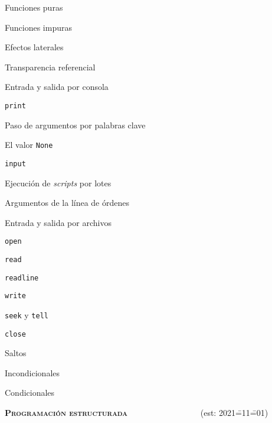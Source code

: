 \begin{longenum}
\begin{longenum}
        \begin{longenum}
            \item Funciones puras
            \item Funciones impuras
            \item Efectos laterales
            \item Transparencia referencial
            \item Entrada y salida por consola
            \begin{longenum}
                \item \texttt{print}
                \begin{longenum}
                    \item Paso de argumentos por palabras clave
                    \item El valor \texttt{None}
                \end{longenum}
                \item \texttt{input}
            \end{longenum}
            \item Ejecución de \textit{scripts} por lotes
            \begin{longenum}
                \item Argumentos de la línea de órdenes
            \end{longenum}
            \item Entrada y salida por archivos
            \begin{longenum}
                \item \texttt{open}
                \item \texttt{read}
                \item \texttt{readline}
                \item \texttt{write}
                \item \texttt{seek} y \texttt{tell}
                \item \texttt{close}
            \end{longenum}
        \end{longenum}
        \item Saltos
        \begin{longenum}
            \item Incondicionales
            \item Condicionales
        \end{longenum}
    \end{longenum}
    \item \textbf{\textsc{Programación estructurada}} \ \ \ \ \ \ \ \ \ \ \ \ \ \ \ \ \ (est: 2021\==11\==01)

\end{longenum}
